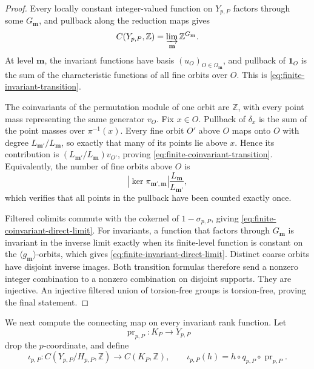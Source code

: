 \begin{proof}
Every locally constant integer-valued function on \(Y_{p,P}\) factors through
some \(G_{\mathbf m}\), and pullback along the reduction maps gives
\[
 C(Y_{p,P},\mathbb Z)
 =\varinjlim_{\mathbf m}\mathbb Z^{G_{\mathbf m}}.
\]
At level \(\mathbf m\), the invariant functions have basis
\((u_O)_{O\in\Omega_{\mathbf m}}\), and pullback of \(\mathbf1_O\) is the
sum of the characteristic functions of all fine orbits over \(O\).  This is
\eqref{eq:finite-invariant-transition}.

The coinvariants of the permutation module of one orbit are \(\mathbb Z\),
with every point mass representing the same generator \(v_O\).  Fix
\(x\in O\).  Pullback of \(\delta_x\) is the sum of the point masses over
\(\pi^{-1}(x)\).  Every fine orbit \(O'\) above \(O\) maps onto \(O\) with
degree \(L_{\mathbf m'}/L_{\mathbf m}\), so exactly that many of its points
lie above \(x\).  Hence its contribution is
\((L_{\mathbf m'}/L_{\mathbf m})v_{O'}\), proving
\eqref{eq:finite-coinvariant-transition}.  Equivalently, the number of fine
orbits above \(O\) is
\[
 |\ker\pi_{\mathbf m',\mathbf m}|
 \frac{L_{\mathbf m}}{L_{\mathbf m'}},
\]
which verifies that all points in the pullback have been counted exactly
once.

Filtered colimits commute with the cokernel of
\(1-\sigma_{p,P}\), giving
\eqref{eq:finite-coinvariant-direct-limit}.  For invariants, a function that
factors through \(G_{\mathbf m}\) is invariant in the inverse limit exactly
when its finite-level function is constant on the
\(\langle g_{\mathbf m}\rangle\)-orbits, which gives
\eqref{eq:finite-invariant-direct-limit}.  Distinct coarse orbits have
disjoint inverse images.  Both transition formulas therefore send a nonzero
integer combination to a nonzero combination on disjoint supports.  They are
injective.  An injective filtered union of torsion-free groups is
torsion-free, proving the final statement.
\end{proof}

We next compute the connecting map on every invariant rank function.  Let
\begin{equation}
 \operatorname{pr}_{p,P}:K_P\longrightarrow Y_{p,P}
 \label{eq:finite-unit-drop-map}
\end{equation}
drop the \(p\)-coordinate, and define
\begin{equation}
 \iota_{p,P}:C(Y_{p,P}/H_{p,P},\mathbb Z)
 \longrightarrow C(K_P,\mathbb Z),
 \qquad
 \iota_{p,P}(h)=h\circ q_{p,P}\circ\operatorname{pr}_{p,P}.
 \label{eq:finite-invariant-ideal-pullback}
\end{equation}

